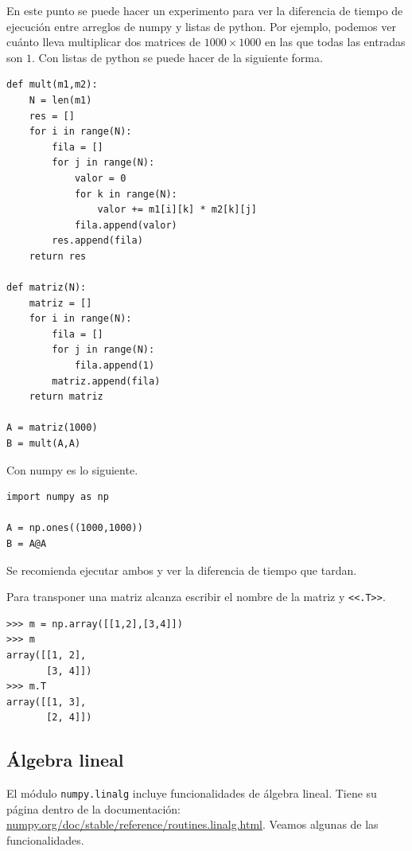 \documentclass[a4paper, 12pt]{report}
\theoremstyle{definition}
\begin{document}
En este punto se puede hacer un experimento para ver la diferencia de tiempo de ejecución entre arreglos de numpy y listas de python. Por ejemplo, podemos ver cuánto lleva multiplicar dos matrices de $1000\times 1000$ en las que todas las entradas son $1$. Con listas de python se puede hacer de la siguiente forma.
\begin{verbatim}
def mult(m1,m2):
    N = len(m1)
    res = []
    for i in range(N):
        fila = []
        for j in range(N):
            valor = 0
            for k in range(N):
                valor += m1[i][k] * m2[k][j]
            fila.append(valor)
        res.append(fila)
    return res

def matriz(N):
    matriz = []
    for i in range(N):
        fila = []
        for j in range(N):
            fila.append(1)
        matriz.append(fila)
    return matriz

A = matriz(1000)
B = mult(A,A)
\end{verbatim}
Con numpy es lo siguiente.
\begin{verbatim}
import numpy as np

A = np.ones((1000,1000))
B = A@A
\end{verbatim}
Se recomienda ejecutar ambos y ver la diferencia de tiempo que tardan.

Para transponer una matriz alcanza escribir el nombre de la matriz y {\tt <<.T>>}.
\begin{verbatim}
>>> m = np.array([[1,2],[3,4]])
>>> m
array([[1, 2],
       [3, 4]])
>>> m.T
array([[1, 3],
       [2, 4]])
\end{verbatim}

\subsection{Álgebra lineal}

El módulo {\tt numpy.linalg} incluye funcionalidades de álgebra lineal. Tiene su página dentro de la documentación: \href{https://numpy.org/doc/stable/reference/routines.linalg.html}{numpy.org/doc/stable/reference/routines.linalg.html}. Veamos algunas de las funcionalidades.
\end{document}
